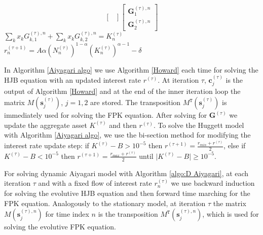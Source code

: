 \documentclass[11pt]{article}
\numberwithin{equation}{section}
\theoremstyle{Claim}
\def\bfs{{\mathbf{s}}}
\def\bG{{\mathbf{G}}}
\newcommand{\bc}{\mathbf{c}}
\theoremstyle{plain}
\begin{document}
\begin{algorithm}[H]
{{$$\begin{bmatrix}
            \end{bmatrix}
            \begin{bmatrix}
                \bG^{(\tau),n}_{1}\\
                \bG^{(\tau),n}_{2}
            \end{bmatrix}
    $$
        }
    $
    \sum_k x_k G^{(\tau),n}_{k,1}+\sum_k x_k G^{(\tau),n}_{k,2}=K^{(\tau)}_n
    $
    \\
    $
    r_n^{(\tau+1)}= A\alpha \left(N_n^{(\tau)}\right)^{1 - \alpha}\left(K_n^{(\tau)}\right)^{\alpha-1}-\delta
    $
    }
\end{algorithm}

In Algorithm \ref{Aiyagari algo} we use Algorithm \ref{Howard} each time for solving the HJB equation with an updated interest rate $r^{(\tau)}$. At iteration $\tau$, $\bc^{(\tau)}_j$ is the output of Algorithm \ref{Howard} and at the end of the inner iteration loop the matrix $M\left(\bfs^{(\tau)}_j\right)$, $j=1,2$ are stored. The transposition $M^{\texttt{T}}\left(\bfs^{(\tau)}_j\right)$ is immediately used for solving the FPK equation. After solving for $\bG^{(\tau)}$ we update the aggregate asset $K^{(\tau)}$ and then $r^{(\tau)}$. To solve the Huggett model with Algorithm \ref{Aiyagari algo}, we use the bi-section method for modifying the interest rate update step: if $K^{(\tau)}-B> 10^{-5}$ then $r^{(\tau+1)} =\frac{r_{min}+r^{(\tau)}}{2}$, else if $K^{(\tau)}-B< 10^{-5}$ then $r^{(\tau+1)} = \frac{r_{max}+r^{(\tau)}}{2}$ until $\vert K^{(\tau)}-B\vert \geq 10^{-5}$. \par
For solving dynamic Aiyagari model with Algorithm \ref{algo:D Aiyagari}, at each iteration $\tau$ and with a fixed flow of interest rate $r^{(\tau)}_n$ we use backward induction for solving the evolutive HJB equation and then forward time marching for the FPK equation. Analogously to the stationary model, at iteration $\tau$ the matrix $M\left(\bfs_{j}^{(\tau),n}\right)$ for time index $n$ is the transposition $M^{\texttt{T}}\left(\bfs_{j}^{(\tau),n}\right)$, which is used for solving the evolutive FPK equation. \\
\end{document}
